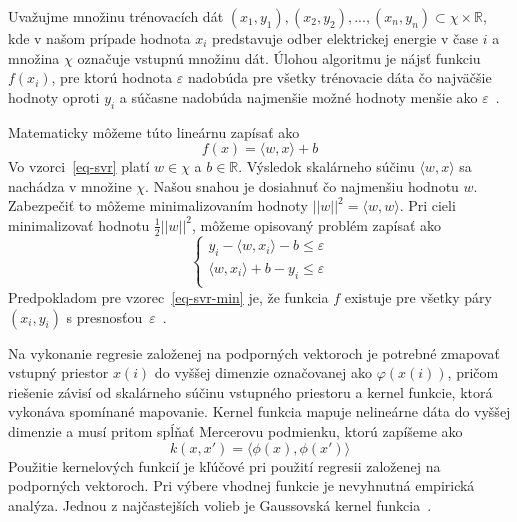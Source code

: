 \documentclass[a4paper,slovak,12pt,appendix]{article}
\begin{document}
Uvažujme množinu trénovacích dát
${(x_1, y_1), (x_2, y_2), ..., (x_n, y_n)} \subset \chi \times \mathbb{R}$, kde
v našom prípade hodnota $x_i$ predstavuje odber elektrickej energie v čase $i$
a množina $\chi$ označuje vstupnú množinu dát. Úlohou algoritmu je nájsť
funkciu  $f(x_i)$, pre ktorú hodnota $\varepsilon$ nadobúda pre všetky
trénovacie dáta čo najväčšie hodnoty oproti $y_i$ a súčasne nadobúda
najmenšie možné hodnoty menšie ako $\varepsilon$~\cite{Smola2004}.

Matematicky môžeme túto lineárnu zapísať ako
\begin{equation}
  f(x) = \langle w, x \rangle +  b
  \label{eq-svr}
\end{equation}
Vo vzorci~\ref{eq-svr} platí $w \in \chi$ a $b \in \mathbb{R}$. Výsledok
skalárneho súčinu $\langle w, x \rangle$ sa nachádza v množine $\chi$. Našou
snahou je dosiahnuť čo najmenšiu hodnotu $w$. Zabezpečiť to môžeme
minimalizovaním hodnoty $|| w ||^2 = \langle w, w \rangle$. Pri cieli
minimalizovať hodnotu $\frac{1}{2} || w ||^2$, môžeme opisovaný problém zapísať
ako
\begin{equation}
  \begin{cases}
    y_i - \langle w, x_i \rangle - b \leq \varepsilon \\
    \langle w, x_i \rangle + b - y_i \leq \varepsilon \\
  \end{cases}
  \label{eq-svr-min}
\end{equation}
Predpokladom pre vzorec~\ref{eq-svr-min} je, že funkcia $f$ existuje pre všetky
páry $(x_i, y_i)$ s presnosťou~$\varepsilon$~\cite{Smola2004}.

Na vykonanie regresie založenej na podporných vektoroch je potrebné zmapovať
vstupný priestor $x(i)$ do vyššej dimenzie označovanej ako $\varphi(x(i))$,
pričom riešenie závisí od skalárneho súčinu vstupného priestoru a kernel funkcie,
ktorá vykonáva spomínané mapovanie. Kernel funkcia mapuje nelineárne dáta do
vyššej dimenzie a musí pritom spĺňať Mercerovu podmienku, ktorú zapíšeme ako
\begin{equation}
	k(x, x') = \langle \phi(x), \phi(x') \rangle
  \label{eq-svr-cond}
\end{equation}
Použitie kernelových funkcií je kľúčové pri použití regresii založenej na
podporných vektoroch. Pri výbere vhodnej funkcie je nevyhnutná empirická analýza.
Jednou z najčastejších volieb je Gaussovská kernel funkcia~\cite{Sapankevych2009}.

\end{document}
